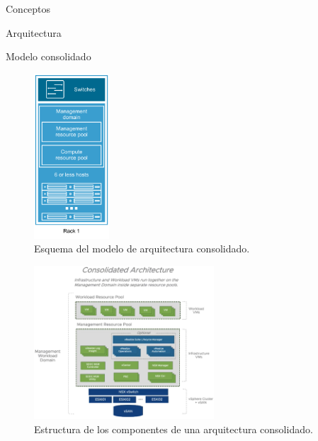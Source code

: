 \begin{section}{Conceptos}
\begin{subsection}{Arquitectura}
\begin{subsubsection}{Modelo consolidado}
\begin{figure}[h!]
  \centering
  \includegraphics[width=0.25\textwidth]{imaxes/conceptosPrevios/modelConsolidated.png}
  \caption{Esquema del modelo de arquitectura consolidado.}
  \label{fig:modeloconsolidated}
\end{figure}

\begin{figure}[h!]
  \centering
  \includegraphics[width=0.6\textwidth]{imaxes/conceptosPrevios/consolidatedArch.png}
  \caption{Estructura de los componentes de una arquitectura consolidado.}
  \label{fig:consolidatedArch}
\end{figure}
\FloatBarrier

\end{subsubsection}
\end{subsection}


\end{section}
